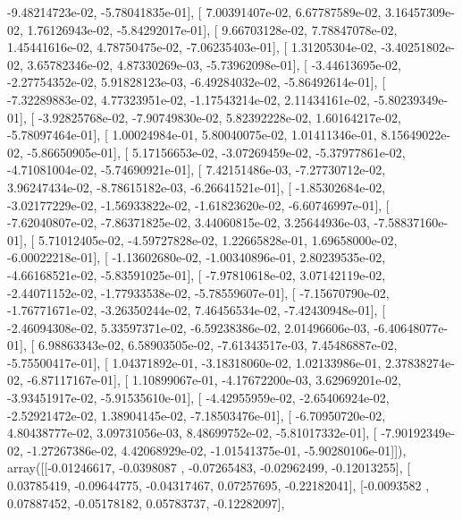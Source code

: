 \documentclass{article}
\begin{document}
         -9.48214723e-02,  -5.78041835e-01],
       [  7.00391407e-02,   6.67787589e-02,   3.16457309e-02,
          1.76126943e-02,  -5.84292017e-01],
       [  9.66703128e-02,   7.78847078e-02,   1.45441616e-02,
          4.78750475e-02,  -7.06235403e-01],
       [  1.31205304e-02,  -3.40251802e-02,   3.65782346e-02,
          4.87330269e-03,  -5.73962098e-01],
       [ -3.44613695e-02,  -2.27754352e-02,   5.91828123e-03,
         -6.49284032e-02,  -5.86492614e-01],
       [ -7.32289883e-02,   4.77323951e-02,  -1.17543214e-02,
          2.11434161e-02,  -5.80239349e-01],
       [ -3.92825768e-02,  -7.90749830e-02,   5.82392228e-02,
          1.60164217e-02,  -5.78097464e-01],
       [  1.00024984e-01,   5.80040075e-02,   1.01411346e-01,
          8.15649022e-02,  -5.86650905e-01],
       [  5.17156653e-02,  -3.07269459e-02,  -5.37977861e-02,
         -4.71081004e-02,  -5.74690921e-01],
       [  7.42151486e-03,  -7.27730712e-02,   3.96247434e-02,
         -8.78615182e-03,  -6.26641521e-01],
       [ -1.85302684e-02,  -3.02177229e-02,  -1.56933822e-02,
         -1.61823620e-02,  -6.60746997e-01],
       [ -7.62040807e-02,  -7.86371825e-02,   3.44060815e-02,
          3.25644936e-03,  -7.58837160e-01],
       [  5.71012405e-02,  -4.59727828e-02,   1.22665828e-01,
          1.69658000e-02,  -6.00022218e-01],
       [ -1.13602680e-02,  -1.00340896e-01,   2.80239535e-02,
         -4.66168521e-02,  -5.83591025e-01],
       [ -7.97810618e-02,   3.07142119e-02,  -2.44071152e-02,
         -1.77933538e-02,  -5.78559607e-01],
       [ -7.15670790e-02,  -1.76771671e-02,  -3.26350244e-02,
          7.46456534e-02,  -7.42430948e-01],
       [ -2.46094308e-02,   5.33597371e-02,  -6.59238386e-02,
          2.01496606e-03,  -6.40648077e-01],
       [  6.98863343e-02,   6.58903505e-02,  -7.61343517e-03,
          7.45486887e-02,  -5.75500417e-01],
       [  1.04371892e-01,  -3.18318060e-02,   1.02133986e-01,
          2.37838274e-02,  -6.87117167e-01],
       [  1.10899067e-01,  -4.17672200e-03,   3.62969201e-02,
         -3.93451917e-02,  -5.91535610e-01],
       [ -4.42955959e-02,  -2.65406924e-02,  -2.52921472e-02,
          1.38904145e-02,  -7.18503476e-01],
       [ -6.70950720e-02,   4.80438777e-02,   3.09731056e-03,
          8.48699752e-02,  -5.81017332e-01],
       [ -7.90192349e-02,  -1.27267386e-02,   4.42068929e-02,
         -1.01541375e-01,  -5.90280106e-01]]), array([[-0.01246617, -0.0398087 , -0.07265483, -0.02962499, -0.12013255],
       [ 0.03785419, -0.09644775, -0.04317467,  0.07257695, -0.22182041],
       [-0.0093582 ,  0.07887452, -0.05178182,  0.05783737, -0.12282097],
\end{document}
